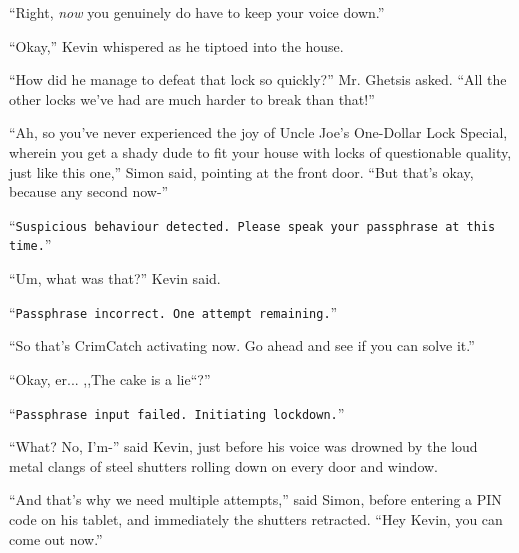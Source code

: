 \documentclass[10pt,a4paper]{article}
\newcommand{\lang}[2]{ #2 \par}
\newcommand{\ai}[2]{
	\lang{
		-- \texttt{#1}
	}{
		``\texttt{#2}''
	}
}
\newcommand{\mainname}{Simon}
\newcommand{\policename}{Mr. Ghetsis}
\newcommand{\featurename}{CrimCatch}
\newcommand{\criminalname}{Kevin}
\begin{document}
\lang{-- Так, а вот \emph{теперь} честно надо быть тихим.}{``Right, \emph{now} you genuinely do have to keep your voice down.''}
\lang{-- Хорошо, -- прошептал \criminalname{}, крадясь в дом.}{``Okay,'' \criminalname{} whispered as he tiptoed into the house.}
\lang{-- А всё-таки, как это у него получилось взломать этот замок так быстро? -- спросил \policename{}. -- Таких слабых замков я ещё не видел!}{``How did he manage to defeat that lock so quickly?'' \policename{} asked. ``All the other locks we've had are much harder to break than that!''}
\lang{-- Это значит, вы никогда не встречались с таким восхитительным предложением, как замки на развес от дяди Серёжи. Там обязательная бесплатная установка, что значит, что странноватый человек ставит вам на весь дом замки очень сомнительного качества, вроде как этот, -- \mainname{} указал на открытую дверь. -- Но Это не важно, потому что вот прям сейчас-}{``Ah, so you've never experienced the joy of Uncle Joe's One-Dollar Lock Special, wherein you get a shady dude to fit your house with locks of questionable quality, just like this one,'' \mainname{} said, pointing at the front door. ``But that's okay, because any second now-''}
\ai{Замечено подозрительное поведение. Пожалуйста, произнесите кодовую фразу сейчас.}{Suspicious behaviour detected. Please speak your passphrase at this time.}
\lang{-- Эмм, а это что ещё за..? -- сказал \criminalname{}.}{``Um, what was that?'' \criminalname{} said.}
\ai{Кодовая фраза неверна. Остается одна попытка.}{Passphrase incorrect. One attempt remaining.}
\lang{Вот и \featurename{} запускается. Попробуй угадать пароль.}{``So that's \featurename{} activating now. Go ahead and see if you can solve it.''}
\lang{-- Так, ну... ``Торт -- это ложь?''}{``Okay, er... ,,The cake is a lie``?''}
\ai{Ввод кодовой фразы неуспешен. Активируется изоляция здания.}{Passphrase input failed. Initiating lockdown.}
\lang{-- Что? Нет, я же- -- только и успел сказать \criminalname{} до того, как его голос не заглушил железный лязг закрывающихся металлических ставней на всех дверях и окнах.}{``What? No, I'm-'' said \criminalname{}, just before his voice was drowned by the loud metal clangs of steel shutters rolling down on every door and window.}
\lang{-- И вот почему нам надо несколько попыток, -- сказал \mainname{}, набирая PIN-код на своём планшете, и мгновенно ставни растворились. -- Эй, \criminalname{}, можно выходить!}{``And that's why we need multiple attempts,'' said \mainname{}, before entering a PIN code on his tablet, and immediately the shutters retracted. ``Hey \criminalname{}, you can come out now.''}
\end{document}
